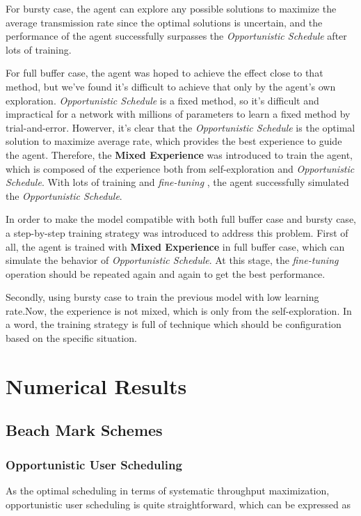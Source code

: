 \documentclass[conference,compsocconf]{IEEEtran}
\begin{document}
For bursty case, the agent can explore any possible solutions to maximize the average transmission rate since the optimal solutions is uncertain, 
and the performance of the agent successfully surpasses the \textit{Opportunistic Schedule} after lots of training.

For full buffer case, the agent was hoped to achieve the effect close to that method, 
but we've found it's difficult to achieve that only by the agent's own exploration.
\textit{Opportunistic Schedule} is a fixed method, 
so it's difficult and impractical for a network with millions of parameters to learn a fixed method by trial-and-error.
Howerver, it's clear that the \textit{Opportunistic Schedule} is the optimal solution to maximize average rate, 
which provides the best experience to guide the agent.
Therefore, the \textbf{Mixed Experience} was introduced to train the agent, which is composed of the experience both from self-exploration and \textit{Opportunistic Schedule}.
With lots of training and \textit{fine-tuning} \cite{HowardUniversal}, the agent successfully simulated the \textit{Opportunistic Schedule}.

In order to make the model compatible with both full buffer case and bursty case, a step-by-step training strategy was introduced to address this problem.
First of all, the agent is trained with \textbf{Mixed Experience} in full buffer case, which can simulate the behavior of \textit{Opportunistic Schedule}.
At this stage, the \textit{fine-tuning} operation should be repeated again and again to get the best performance.

Secondly, using bursty case to train the previous model with low learning rate.Now, the experience is not mixed, which is only from the self-exploration.
In a word, the training strategy is full of technique which should be configuration based on the specific situation.

\section{Numerical Results}




\subsection{Beach Mark Schemes}
\subsubsection{Opportunistic User Scheduling} As the optimal scheduling in terms of systematic throughput maximization, opportunistic user scheduling is quite straightforward, which can be expressed as
\end{document}
